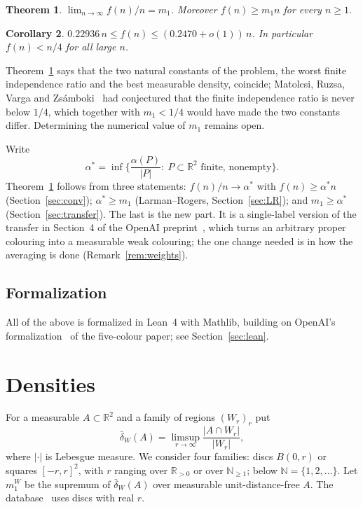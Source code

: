 \documentclass[11pt]{amsart}
\newtheorem{theorem}{Theorem}[section]
\newtheorem{corollary}[theorem]{Corollary}
\theoremstyle{definition}
\theoremstyle{remark}
\newcommand{\R}{\mathbb{R}}
\newcommand{\N}{\mathbb{N}}
\newcommand{\dens}{\bar\delta}
\begin{document}
\begin{theorem}\label{thm:main}
$\displaystyle\lim_{n\to\infty}f(n)/n=m_1$. Moreover $f(n)\ge m_1n$ for every $n\ge1$.
\end{theorem}

\begin{corollary}\label{cor:num}
$0.22936\,n\le f(n)\le(0.2470+o(1))\,n$. In particular $f(n)<n/4$ for all large $n$.
\end{corollary}

Theorem~\ref{thm:main} says that the two natural constants of the problem, the worst finite independence ratio and the best measurable density, coincide; Matolcsi, Ruzsa, Varga and Zs\'amboki~\cite[Conjecture~1]{MRVZ} had conjectured that the finite independence ratio is never below $1/4$, which together with $m_1<1/4$ would have made the two constants differ. Determining the numerical value of $m_1$ remains open.

Write
\[
  \alpha^*=\inf\Big\{\frac{\alpha(P)}{|P|}:\ P\subset\R^2\text{ finite, nonempty}\Big\}.
\]
Theorem~\ref{thm:main} follows from three statements: $f(n)/n\to\alpha^*$ with $f(n)\ge\alpha^*n$ (Section~\ref{sec:conv}); $\alpha^*\ge m_1$ (Larman--Rogers, Section~\ref{sec:LR}); and $m_1\ge\alpha^*$ (Section~\ref{sec:transfer}). The last is the new part. It is a single-label version of the transfer in Section~4 of the OpenAI preprint~\cite{OAI}, which turns an arbitrary proper colouring into a measurable weak colouring; the one change needed is in how the averaging is done (Remark~\ref{rem:weights}).

\subsection*{Formalization}
All of the above is formalized in Lean~4 with Mathlib, building on OpenAI's formalization~\cite{OAIrepo} of the five-colour paper; see Section~\ref{sec:lean}.

\section{Densities}\label{sec:dens}

For a measurable $A\subset\R^2$ and a family of regions $(W_r)_{r}$ put
\[
  \dens_W(A)=\limsup_{r\to\infty}\frac{|A\cap W_r|}{|W_r|},
\]
where $|\cdot|$ is Lebesgue measure. We consider four families: discs $B(0,r)$ or squares $[-r,r]^2$, with $r$ ranging over $\R_{>0}$ or over $\N_{\ge1}$; below $\N=\{1,2,\dots\}$. Let $m_1^W$ be the supremum of $\dens_W(A)$ over measurable unit-distance-free $A$. The database~\cite{EP} uses discs with real $r$.
\end{document}

